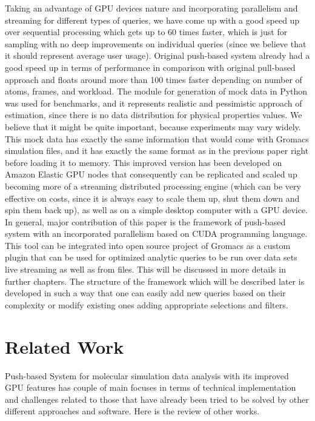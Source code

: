 \documentclass[11pt,a4paper]{report}
\begin{document}
Taking an advantage of GPU devices nature and incorporating parallelism and streaming for different types of queries, we have come up with a good speed up over sequential processing which gets up to 60 times faster, which is just for sampling with no deep improvements on individual queries (since we believe that it should represent average user usage). Original push-based system already had a good speed up in terms of performance in comparison with original pull-based approach and floats around more than 100 times faster depending on number of atoms, frames, and workload. The module for generation of mock data in Python  was used for benchmarks, and it represents realistic and pessimistic approach of estimation, since there is no data distribution for physical properties values. We believe that it might be quite important, because experiments may vary widely. This mock data has exactly the same information that would come with Gromacs simulation files, and it has exactly the same format as in the previous paper \cite{mainPaper} right before loading it to memory. This improved version has been developed on Amazon Elastic GPU \cite{amazonGPU} nodes that consequently can be replicated and scaled up becoming more of a streaming distributed processing engine (which can be very effective on costs, since it is always easy to scale them up, shut them down and spin them back up), as well as on a simple desktop computer with a GPU device.
In general, major contribution of this paper is the framework of push-based system with an incorporated parallelism based on CUDA programming language. This tool can be integrated into open source project of Gromacs as a custom plugin that can be used for optimized analytic queries to be run over data sets live streaming as well as from files. This will be discussed in more details in further chapters.
The structure of the framework which will be described later is developed in such a way that one can easily add new queries based on their complexity or modify existing ones adding appropriate selections and filters.



\chapter{Related Work}\label{sc:relatedwork}

Push-based System for molecular simulation data analysis with its improved GPU features has couple of main focuses in terms of technical implementation and challenges related to those that have already been tried to be solved by other different approaches and software. Here is the review of other works.
\end{document}
